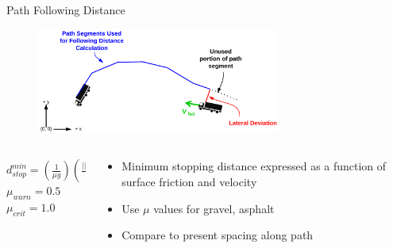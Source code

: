 \documentclass{beamer}
\begin{document}
    \begin{frame}{Path Following Distance}
      \begin{figure}[ht] \centering
        \includegraphics[width=8cm] {../graphics/dist_diagram.png}
      \end{figure}
      \begin{columns}
        \begin{column}{0.5\textwidth} \centering
            $d_{stop}^{min} = \left( \frac {1} {\mu g} \right) \left(\frac {||v_{foll}||^2} {2} \right)$ \\
            $\mu_{warn} = 0.5$ \\
            $\mu_{crit} = 1.0$
        \end{column}
        \begin{column}{0.5\textwidth}
          \begin{itemize} \scriptsize
            \item Minimum stopping distance expressed as a function of surface friction and velocity
            \item Use $\mu$ values for gravel, asphalt
            \item Compare to present spacing along path
          \end{itemize}
        \end{column}
      \end{columns}
    \end{frame}
\end{document}
